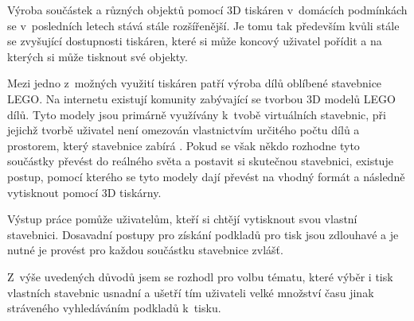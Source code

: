 \label{introduction}
Výroba součástek a různých objektů pomocí 3D tiskáren v~domácích podmínkách se v~posledních letech stává stále rozšířenější. Je tomu tak především kvůli stále se zvyšující dostupnosti tiskáren, které si může koncový uživatel pořídit a na kterých si může tisknout své objekty. 

Mezi jedno z~možných využití tiskáren patří výroba dílů oblíbené stavebnice LEGO. Na internetu existují komunity zabývající se tvorbou 3D modelů LEGO dílů. Tyto modely jsou primárně využívány k~tvobě virtuálních stavebnic, při jejichž tvorbě uživatel není omezován vlastnictvím určitého počtu dílů a prostorem, který stavebnice zabírá \autocite{ldraw:homepage}. Pokud se však někdo rozhodne tyto součástky převést do reálného světa a postavit si skutečnou stavebnici, existuje postup, pomocí kterého se tyto modely dají převést na vhodný formát a následně vytisknout pomocí 3D tiskárny.

Výstup práce pomůže uživatelům, kteří si chtějí vytisknout svou vlastní stavebnici. Dosavadní postupy pro získání podkladů pro tisk jsou zdlouhavé a je nutné je provést pro každou součástku stavebnice zvlášť.

Z~výše uvedených důvodů jsem se rozhodl pro volbu tématu, které výběr i tisk vlastních stavebnic usnadní a ušetří tím uživateli velké množství času jinak stráveného vyhledáváním podkladů k~tisku. 

